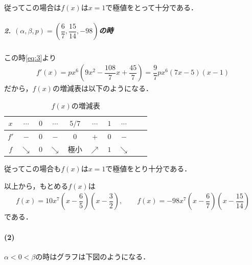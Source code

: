 \documentclass[../../main.tex]{subfiles}
\begin{document}
従ってこの場合は$f(x)$は$x=1$で極値をとって十分である．

\subparagraph{2. $(\alpha,\beta,p)=\left(\dfrac{6}{7},\dfrac{15}{14},-98\right)$の時}
この時\cref{eq:3}より
\begin{align}
  f'(x)=px^6\left(9x^2-\dfrac{108}{7}x+\dfrac{45}{7}\right)=\dfrac{9}{7}px^6(7x-5)(x-1)
\end{align}
だから，$f(x)$の増減表は以下のようになる．

\begin{table}[htb]
  \centering
  \caption{$f(x)$の増減表}
  \begin{tabular}{c|ccccccccc}
    $x$ & $\cdots$ & $0$ & $\cdots$ & $5/7$ & $\cdots$ & $1$ & $\cdots$ \\
    \hline
    $f'$ & $-$ & $0$ & $-$ & $0$ & $+$ & $0$ & $-$ \\
    \hline
    $f$ & $\searrow$ & $0$ & $\searrow$ & 極小 & $\nearrow$ & $1$ & $\searrow$
  \end{tabular}
\end{table}

従ってこの場合も$f(x)$は$x=1$で極値をとり十分である．
\casesend

以上から，もとめる$f(x)$は
\begin{align}
  f(x)=10x^7\left(x-\dfrac{6}{5}\right)\left(x-\dfrac{3}{2}\right), \qquad f(x)=-98x^7\left(x-\dfrac{6}{7}\right)\left(x-\dfrac{15}{14}\right)
\end{align}
である．

\paragraph{(2)}

$\alpha<0<\beta$の時はグラフは下図のようになる．
\end{document}
